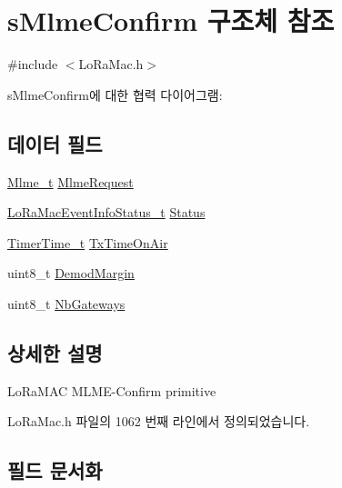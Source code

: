 \hypertarget{structs_mlme_confirm}{}\section{s\+Mlme\+Confirm 구조체 참조}
\label{structs_mlme_confirm}


{\ttfamily \#include $<$Lo\+Ra\+Mac.\+h$>$}



s\+Mlme\+Confirm에 대한 협력 다이어그램\+:
\subsection*{데이터 필드}
\begin{DoxyCompactItemize}
\item 
\mbox{\hyperlink{group___l_o_r_a_m_a_c_ga663544b83d50ec3518608be495896809}{Mlme\+\_\+t}} \mbox{\hyperlink{structs_mlme_confirm_a05e619573c522884eada37bde4e3d1f3}{Mlme\+Request}}
\item 
\mbox{\hyperlink{group___l_o_r_a_m_a_c_gac6ffc346a4c767f7a743c87a686c51b4}{Lo\+Ra\+Mac\+Event\+Info\+Status\+\_\+t}} \mbox{\hyperlink{structs_mlme_confirm_ab360e499d5a7a9e0aa7b4df7239633b5}{Status}}
\item 
\mbox{\hyperlink{utilities_8h_a4215ca43d3e953099ea758ce428599d0}{Timer\+Time\+\_\+t}} \mbox{\hyperlink{structs_mlme_confirm_aa17a8607485db100d315e74853dd217e}{Tx\+Time\+On\+Air}}
\item 
uint8\+\_\+t \mbox{\hyperlink{structs_mlme_confirm_a60502ba4c33cf0435f086a1a9f1b5116}{Demod\+Margin}}
\item 
uint8\+\_\+t \mbox{\hyperlink{structs_mlme_confirm_ac2fbb4be8e3cc46943038a1796010d71}{Nb\+Gateways}}
\end{DoxyCompactItemize}


\subsection{상세한 설명}
Lo\+Ra\+M\+AC M\+L\+M\+E-\/\+Confirm primitive 

Lo\+Ra\+Mac.\+h 파일의 1062 번째 라인에서 정의되었습니다.



\subsection{필드 문서화}
\mbox{\label{structs_mlme_confirm_a60502ba4c33cf0435f086a1a9f1b5116}} 
